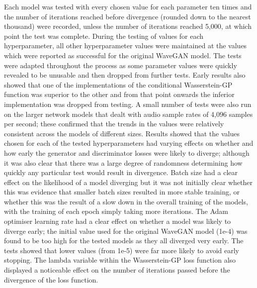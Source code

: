 \documentclass[a4paper, titlepage]{article}
\begin{document}
Each model was tested with every chosen value for each parameter ten times and the number of iterations reached before divergence (rounded down to the nearest thousand) were recorded, unless the number of iterations reached 5,000, at which point the test was complete. 
During the testing of values for each hyperparameter, all other hyperparameter values were maintained at the values which were reported as successful for the original WaveGAN model.
\newline
\newline
The tests were adapted throughout the process as some parameter values were quickly revealed to be unusable and then dropped from further tests.
Early results also showed that one of the implementations of the conditional Wasserstein-GP function was superior to the other and from that point onwards the inferior implementation was dropped from testing.
A small number of tests were also run on the larger network models that dealt with audio sample rates of 4,096 samples per second; these confirmed that the trends in the values were relatively consistent across the models of different sizes.
\newline
\newline
Results showed that the values chosen for each of the tested hyperparameters had varying effects on whether and how early the generator and discriminator losses were likely to diverge; although it was also clear that there was a large degree of randomness determining how quickly any particular test would result in divergence.
\newline
\newline
Batch size had a clear effect on the likelihood of a model diverging but it was not initially clear whether this was evidence that smaller batch sizes resulted in more stable training, or whether this was the result of a slow down in the overall training of the models, with the training of each epoch simply taking more iterations.
\newline
\newline
The Adam optimiser learning rate had a clear effect on whether a model was likely to diverge early; the initial value used for the original WaveGAN model (1e-4) was found to be too high for the tested models as they all diverged very early.
The tests showed that lower values (from 1e-5) were far more likely to avoid early stopping.
\newline
\newline
The lambda variable within the Wasserstein-GP loss function also displayed a noticeable effect on the number of iterations passed before the divergence of the loss function.
\end{document}
